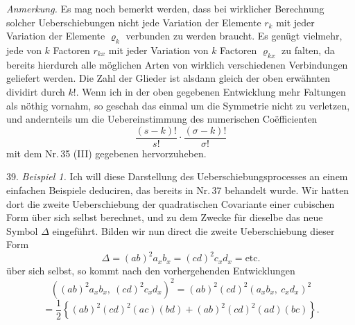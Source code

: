 \textit{Anmerkung.} Es mag noch bemerkt werden, dass bei wirklicher
Berechnung solcher Ueberschiebungen nicht jede Variation der Elemente
$r_k$ mit jeder Variation der Elemente $\varrho_k$ verbunden zu werden
braucht. Es genügt vielmehr, jede  von $k$
Factoren $r_{kx}$ mit jeder Variation von $k$ Factoren $\varrho_{kx}$
zu falten, da bereits hierdurch alle möglichen Arten von wirklich
verschiedenen Verbindungen geliefert werden. Die Zahl der Glieder ist
alsdann gleich der oben erwähnten dividirt durch $k!$. Wenn ich in der
oben gegebenen Entwicklung mehr Faltungen als nöthig vornahm, so
geschah das einmal um die Symmetrie nicht zu verletzen, und
andernteils um die Uebereinstimmung des numerischen Co\"efficienten
\[
\frac{(s-k)!}{s!}\cdot\frac{(\sigma-k)!}{\sigma!}
\]
mit dem Nr.\,35 (III) gegebenen hervorzuheben.

39. \textit{Beispiel 1.} Ich will diese Darstellung des
Ueberschiebungsprocesses an einem einfachen Beispiele deduciren, das
bereits in Nr.\,37 behandelt wurde. Wir hatten dort die zweite
Ueberschiebung der quadratischen Covariante einer cubischen Form über
sich selbst berechnet, und zu dem Zwecke für dieselbe das neue Symbol
$\Delta$ eingeführt. Bilden wir nun direct die zweite Ueberschiebung
dieser Form
\[
\Delta=(ab)^2a_xb_x=(cd)^2c_xd_x=\text{etc.}
\]
über sich selbst, so kommt nach den vorhergehenden Entwicklungen
\[
\left((ab)^2a_xb_x,\ (cd)^2c_xd_x\right)^2=(ab)^2(cd)^2(a_xb_x,\ c_xd_x)^2
\]
\[
=\frac{1}{2}\left\{(ab)^2(cd)^2(ac)(bd)+(ab)^2(cd)^2(ad)(bc)\right\}.
\]


